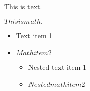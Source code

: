 \documentclass{article}
\begin{document}
This is text.
\begin{comment}
This is a comment.
\end{comment}
$This is math.$
\begin{itemize}
\item Text item 1
\item $Math item 2$
\begin{itemize}
\item Nested text item 1
\item $Nested math item 2$
\end{itemize}
\end{itemize}
\end{document}
